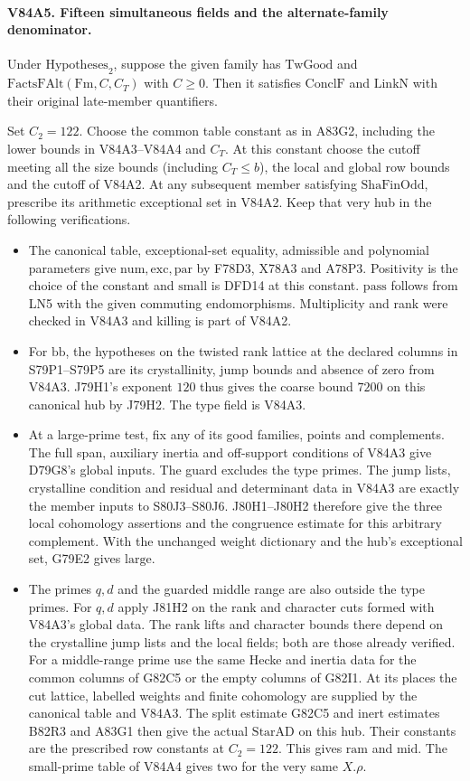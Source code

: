 \paragraph{V84A5. Fifteen simultaneous fields and the alternate-family denominator.}
Under $\mathrm{Hypotheses}_2$, suppose the given family has
$\mathrm{TwGood}$ and $\mathrm{FactsFAlt}(\mathrm{Fm},C,C_T)$
with $C\ge0$. Then it satisfies $\mathrm{ConclF}$ and
$\mathrm{LinkN}$ with their original late-member quantifiers.

Set $C_2=122$. Choose the common table constant as in A83G2,
including the lower bounds in V84A3--V84A4 and $C_T$. At this
constant choose the cutoff meeting all the size bounds
(including $C_T\le b$), the local and global row bounds and the
cutoff of V84A2. At any subsequent member satisfying
$\mathrm{ShaFinOdd}$, prescribe its arithmetic exceptional set in
V84A2. Keep that very hub in the following verifications.
\begin{itemize}
\item The canonical table, exceptional-set equality, admissible and
polynomial parameters give $\mathrm{num},\mathrm{exc},\mathrm{par}$
by F78D3, X78A3 and A78P3. Positivity is the choice of the
constant and $\mathrm{small}$ is DFD14 at this constant.
$\mathrm{pass}$ follows from LN5 with the given commuting
endomorphisms. Multiplicity and rank were checked in V84A3 and
killing is part of V84A2.
\item For $\mathrm{bb}$, the hypotheses on the twisted rank
lattice at the declared columns in S79P1--S79P5 are its
crystallinity, jump bounds and absence of zero from V84A3.
J79H1's exponent $120$ thus gives the coarse bound $7200$ on
this canonical hub by J79H2. The type field is V84A3.
\item At a large-prime test, fix any of its good families,
points and complements. The full span, auxiliary inertia and
off-support conditions of V84A3 give D79G8's global inputs.
The guard excludes the type primes. The jump lists, crystalline
condition and residual and determinant data in V84A3 are exactly
the member inputs to S80J3--S80J6. J80H1--J80H2 therefore give
the three local cohomology assertions and the congruence estimate
for this arbitrary complement. With the unchanged weight dictionary
and the hub's exceptional set, G79E2 gives $\mathrm{large}$.
\item The primes $q,d$ and the guarded middle range are also
outside the type primes. For $q,d$ apply J81H2 on the rank
and character cuts formed with V84A3's global data. The rank
lifts and character bounds there depend on the crystalline
jump lists and the local fields; both are those already verified.
For a middle-range prime use the same Hecke and inertia data for
the common columns of G82C5 or the empty columns of G82I1.
At its places the cut lattice, labelled weights and finite
cohomology are supplied by the canonical table and V84A3.
The split estimate G82C5 and inert estimates B82R3 and A83G1
then give the actual $\mathrm{StarAD}$ on this hub. Their
constants are the prescribed row constants at $C_2=122$.
This gives $\mathrm{ram}$ and $\mathrm{mid}$. The small-prime
table of V84A4 gives $\mathrm{two}$ for the very same $X.\rho$.
\end{itemize}
